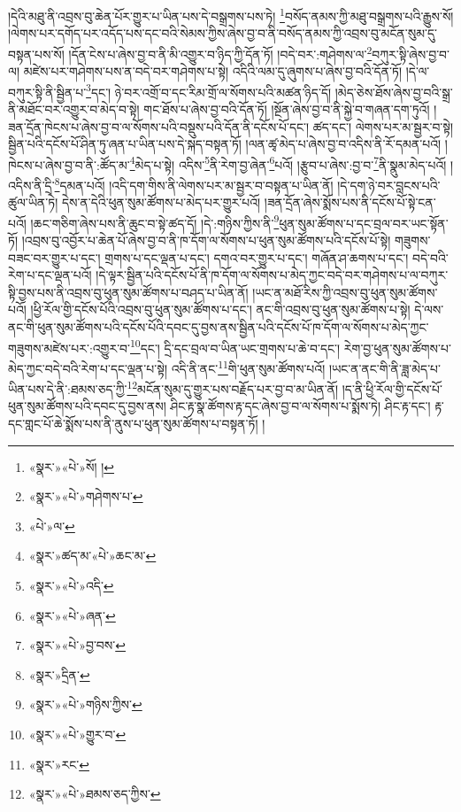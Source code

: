 །དེའི་མཐུ་ནི་འབྲས་བུ་ཆེན་པོར་གྱུར་པ་ཡིན་པས་དེ་བསྒྲགས་པས་ཏེ། \footnote{«སྣར་»«པེ་»སོ། ། }བསོད་ནམས་ཀྱི་མཐུ་བསྒྲགས་པའི་རྒྱུས་སོ། །ལེགས་པར་དགོད་པར་འདོད་པས་དང་བའི་སེམས་ཀྱིས་ཞེས་བྱ་བ་ནི་བསོད་ནམས་ཀྱི་འབྲས་བུ་མངོན་སུམ་དུ་བསྟན་པས་སོ། །དོན་ངེས་པ་ཞེས་བྱ་བ་ནི་མི་འགྱུར་བ་ཉིད་ཀྱི་དོན་ཏོ། །བདེ་བར་:གཤེགས་ལ་\footnote{«སྣར་»«པེ་»གཤེགས་པ་}བཀུར་སྟི་ཞེས་བྱ་བ་ལ། མཛེས་པར་གཤེགས་པས་ན་བདེ་བར་གཤེགས་པ་སྟེ། འདིའི་ལམ་དུ་ཞུགས་པ་ཞེས་བྱ་བའི་དོན་ཏོ། །དེ་ལ་བཀུར་སྟི་ནི་སྦྱིན་པ་\footnote{«པེ་»ལ་}དང་། ཉེ་བར་འགྲོ་བ་དང་རིམ་གྲོ་ལ་སོགས་པའི་མཚན་ཉིད་དོ། །མེད་ཅེས་ཐོས་ཞེས་བྱ་བའི་སྒྲ་ནི་མཐོང་བར་འགྱུར་བ་མེད་བ་སྟེ། གང་ཐོས་པ་ཞེས་བྱ་བའི་དོན་ཏོ། །སྔོན་ཞེས་བྱ་བ་ནི་སྐྱེ་བ་གཞན་དག་ཏུའོ། །ཟན་དྲོན་ཁེངས་པ་ཞེས་བྱ་བ་ལ་སོགས་པའི་བསྡུས་པའི་དོན་ནི་དངོས་པོ་དང་། ཚད་དང་། ལེགས་པར་མ་སྦྱར་བ་སྟེ། སྦྱིན་པའི་དངོས་པོ་ཤིན་ཏུ་ཞན་པ་ཡིན་པས་དེ་སྐད་བསྟན་ཏོ། །ལན་ཚྭ་མེད་པ་ཞེས་བྱ་བ་འདིས་ནི་རོ་དམན་པའོ། །ཁེངས་པ་ཞེས་བྱ་བ་ནི་:ཚོད་མ་\footnote{«སྣར་»ཚད་མ་«པེ་»ཆང་མ་}མེད་པ་སྟེ། འདིས་\footnote{«སྣར་»«པེ་»འདི་}ནི་རེག་བྱ་ཞེན་\footnote{«སྣར་»«པེ་»ཞན་}པའོ། །རྩུབ་པ་ཞེས་:བྱ་བ་\footnote{«སྣར་»«པེ་»བྱ་བས་}ནི་སྣུམ་མེད་པའོ། །འདིས་ནི་དྲི་\footnote{«སྣར་»དྲིན་}དམན་པའོ། །འདི་དག་གིས་ནི་ལེགས་པར་མ་སྦྱར་བ་བསྟན་པ་ཡིན་ནོ། །དེ་དག་ཉེ་བར་བླངས་པའི་ཚུལ་ཡིན་ཏེ། དེས་ན་དེའི་ཕུན་སུམ་ཚོགས་པ་མེད་པར་གྱུར་པའོ། །ཟན་དྲོན་ཞེས་སྨོས་པས་ནི་དངོས་པོ་སྟེ་ངན་པའོ། །ཆང་གཅིག་ཞེས་པས་ནི་ཆུང་བ་སྟེ་ཚད་དོ། །དེ་:གཉིས་ཀྱིས་ནི་\footnote{«སྣར་»«པེ་»གཉིས་ཀྱིས་}ཕུན་སུམ་ཚོགས་པ་དང་བྲལ་བར་ཡང་སྟོན་ཏོ། །འབྲས་བུ་འབྱོར་པ་ཆེན་པོ་ཞེས་བྱ་བ་ནི་ཁ་དོག་ལ་སོགས་པ་ཕུན་སུམ་ཚོགས་པའི་དངོས་པོ་སྟེ། གཟུགས་བཟང་བར་གྱུར་པ་དང་། གྲགས་པ་དང་ལྡན་པ་དང་། དགའ་བར་གྱུར་པ་དང་། གཞོན་ཤ་ཆགས་པ་དང་། བདེ་བའི་རེག་པ་དང་ལྡན་པའོ། །དེ་ལྟར་སྦྱིན་པའི་དངོས་པོ་ནི་ཁ་དོག་ལ་སོགས་པ་མེད་ཀྱང་བདེ་བར་གཤེགས་པ་ལ་བཀུར་སྟི་བྱས་པས་ནི་འབྲས་བུ་ཕུན་སུམ་ཚོགས་པ་བཤད་པ་ཡིན་ནོ། །ཡང་ན་མཐོ་རིས་ཀྱི་འབྲས་བུ་ཕུན་སུམ་ཚོགས་པའོ། །ཕྱི་རོལ་གྱི་དངོས་པོའི་འབྲས་བུ་ཕུན་སུམ་ཚོགས་པ་དང་། ནང་གི་འབྲས་བུ་ཕུན་སུམ་ཚོགས་པ་སྟེ། དེ་ལས་ནང་གི་ཕུན་སུམ་ཚོགས་པའི་དངོས་པོའི་དབང་དུ་བྱས་ནས་སྦྱིན་པའི་དངོས་པོ་ཁ་དོག་ལ་སོགས་པ་མེད་ཀྱང་གཟུགས་མཛེས་པར་:འགྱུར་བ་\footnote{«སྣར་»«པེ་»གྱུར་བ་}དང་། དྲི་དང་བྲལ་བ་ཡིན་ཡང་གྲགས་པ་ཆེ་བ་དང་། རེག་བྱ་ཕུན་སུམ་ཚོགས་པ་མེད་ཀྱང་བདེ་བའི་རེག་པ་དང་ལྡན་པ་སྟེ། འདི་ནི་ནང་\footnote{«སྣར་»རང་}གི་ཕུན་སུམ་ཚོགས་པའོ། །ཡང་ན་ནང་གི་ནི་ཟླ་མེད་པ་ཡིན་པས་དེ་ནི་:ཐམས་ཅད་ཀྱི་\footnote{«སྣར་»«པེ་»ཐམས་ཅད་ཀྱིས་}མངོན་སུམ་དུ་གྱུར་པས་བརྗོད་པར་བྱ་བ་མ་ཡིན་ནོ། །ད་ནི་ཕྱི་རོལ་གྱི་དངོས་པོ་ཕུན་སུམ་ཚོགས་པའི་དབང་དུ་བྱས་ནས། ཤིང་རྟ་སྣ་ཚོགས་རྟ་དང་ཞེས་བྱ་བ་ལ་སོགས་པ་སྨོས་ཏེ། ཤིང་རྟ་དང་། རྟ་དང་གླང་པོ་ཆེ་སྨོས་པས་ནི་ནུས་པ་ཕུན་སུམ་ཚོགས་པ་བསྟན་ཏོ། །
